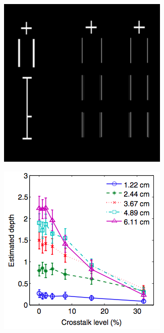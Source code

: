 \begin{figure}[htbp]
    \begin{subfigure}[b]{0.5\textwidth}
        \includegraphics[width=\textwidth]{./Template_Figures/Tsirlin_exp}
        \caption{}\label{fig:tsirlin_exp}
    \end{subfigure}
    \begin{subfigure}[b]{0.5\textwidth}
        \includegraphics[width=\textwidth]{./Template_Figures/tsirlin_res}

\end{subfigure}
\end{figure}
